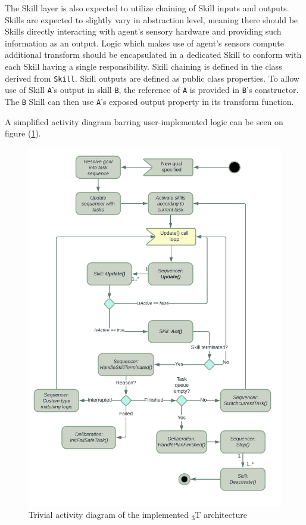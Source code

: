 \documentclass[main.tex]{subfiles}
\begin{document}
The Skill layer is also expected to utilize chaining of Skill inputs and outputs. Skills are 
expected to slightly vary in abstraction level, meaning there should be Skills directly 
interacting with agent's sensory hardware and providing such information as an output. 
Logic which makes use of agent's sensors compute additional transform should be encapsulated in
a dedicated Skill to conform with each Skill having a single responsibility. Skill chaining 
is defined in the class derived from \texttt{Skill}. Skill outputs are defined as 
public class properties. To allow use of Skill \texttt{A}'s output in skill \texttt{B},
the reference of \texttt{A} is provided in \texttt{B}'s constructor. The \texttt{B} Skill 
can then use \texttt{A}'s exposed output property in its transform function.

A simplified activity diagram barring user-implemented logic can be seen on 
figure (\ref{fig-activity-diagram}).

\begin{figure}[htbp]
    \centering
    \includegraphics[width=.9\textwidth]{3T-Activity-diagram.png}
    \caption{Trivial activity diagram of the implemented \textsubscript{3}T architecture}
    \label{fig-activity-diagram}
\end{figure}
\end{document}
